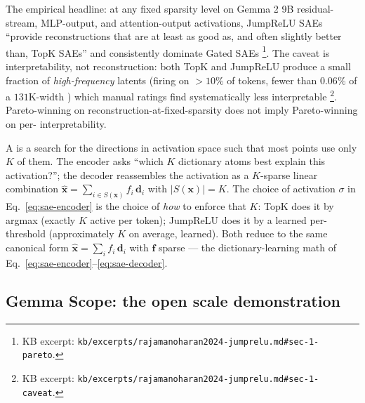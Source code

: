 The empirical headline: at any fixed sparsity level on Gemma 2 9B
residual-stream, MLP-output, and attention-output activations, JumpReLU
SAEs ``provide reconstructions that are at least as good as, and often
slightly better than, TopK SAEs'' and consistently dominate Gated SAEs
\citep[\S 1]{rajamanoharan2024-jumprelu}\footnote{KB excerpt:
\texttt{kb/excerpts/rajamanoharan2024-jumprelu.md\#sec-1-pareto}.}. The
caveat is interpretability, not reconstruction: both TopK and JumpReLU
produce a small fraction of \emph{high-frequency} latents (firing on
$>10\%$ of tokens, fewer than $0.06\%$ of a $131$K-width ) which
manual ratings find systematically less interpretable
\citep[\S 1]{rajamanoharan2024-jumprelu}\footnote{KB excerpt:
\texttt{kb/excerpts/rajamanoharan2024-jumprelu.md\#sec-1-caveat}.}.
Pareto-winning on reconstruction-at-fixed-sparsity does not imply
Pareto-winning on per- interpretability.

\begin{intuition}
A  is a search for the directions in activation space
such that most points use only $K$ of them. The encoder asks ``which
$K$ dictionary atoms best explain this activation?''; the decoder
reassembles the activation as a $K$-sparse linear combination
$\hat{\mathbf{x}} = \sum_{i \in S(\mathbf{x})} f_i\,\mathbf{d}_i$ with
$|S(\mathbf{x})| = K$. The choice of activation $\sigma$ in
Eq.~\eqref{eq:sae-encoder} is the choice of \emph{how} to enforce that
$K$: TopK does it by argmax (exactly $K$ active per token); JumpReLU
does it by a learned per- threshold (approximately $K$ on
average, learned). Both reduce to the same canonical form
$\hat{\mathbf{x}} = \sum_i f_i\,\mathbf{d}_i$ with $\mathbf{f}$
sparse --- the dictionary-learning math of
Eq.~\eqref{eq:sae-encoder}--\eqref{eq:sae-decoder}.
\end{intuition}

\subsection{Gemma Scope: the open scale demonstration}
\label{sec:sae-gemma-scope}

